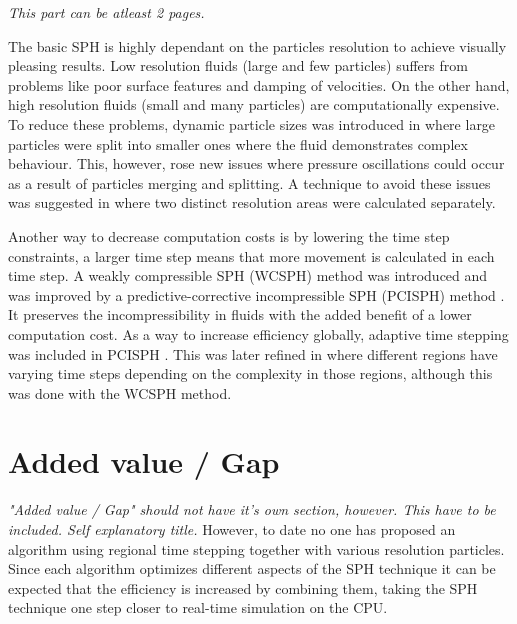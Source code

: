 \documentclass[../main.tex]{subfiles}
\begin{document}
\textit{This part can be atleast 2 pages.}

The basic SPH \cite{muller2003particle} is highly dependant on the particles resolution to achieve visually pleasing results. Low resolution fluids (large and few particles) suffers from problems like poor surface features and damping of velocities. On the other hand, high resolution fluids (small and many particles) are computationally expensive. To reduce these problems, dynamic particle sizes was introduced in \cite{adams2007adaptively} where large particles were split into smaller ones where the fluid demonstrates complex behaviour. This, however, rose new issues where pressure oscillations could occur as a result of particles merging and splitting. A technique to avoid these issues was suggested in \cite{solenthaler2011two} where two distinct resolution areas were calculated separately.

Another way to decrease computation costs is by lowering the time step constraints, a larger time step means that more movement is calculated in each time step. A weakly compressible SPH (WCSPH) method \cite{monaghan2005smoothed,becker2007weakly} was introduced and was improved by a predictive-corrective incompressible SPH (PCISPH) method \cite{solenthaler2009predictive}. It preserves the incompressibility in fluids with the added benefit of a lower computation cost. As a way to increase efficiency globally, adaptive time stepping was included in PCISPH \cite{ihmsen2010boundary}. This was later refined in \cite{goswami2014regional} where different regions have varying time steps depending on the complexity in those regions, although this was done with the WCSPH method. 

\section{Added value / Gap}
\textit{"Added value / Gap" should not have it's own section, however. This have to be included. Self explanatory title.}
However, to date no one has proposed an algorithm using regional time stepping together with various resolution particles. Since each algorithm optimizes different aspects of the SPH technique it can be expected that the efficiency is increased by combining them, taking the SPH technique one step closer to real-time simulation on the CPU.
\end{document}
